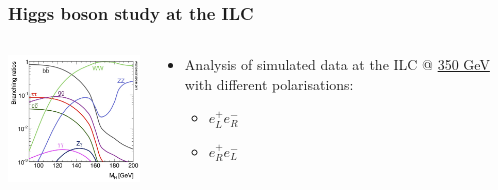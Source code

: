 \documentclass{beamer}
\begin{document}
    \begin{frame}
    \frametitle{Higgs boson study at the ILC}

    \vspace{-0.3cm}
    \begin{columns}[c]
      \begin{column}{5cm}
        \begin{center}
          \includegraphics[width = 5cm]{Pictures/higgsbr.jpg}
        \end{center}
      \end{column}
      \begin{column}{5cm}
        \begin{itemize}
          \item Analysis of simulated data at the ILC @ \hyperlink{Xsec}{350 GeV} with different polarisations:
            \begin{itemize}
              \item $e^+_L e^-_R$
              \item $e^+_R e^-_L$
            \end{itemize}
        \end{itemize}
      \end{column}
    \end{columns}

\end{frame}
\end{document}
